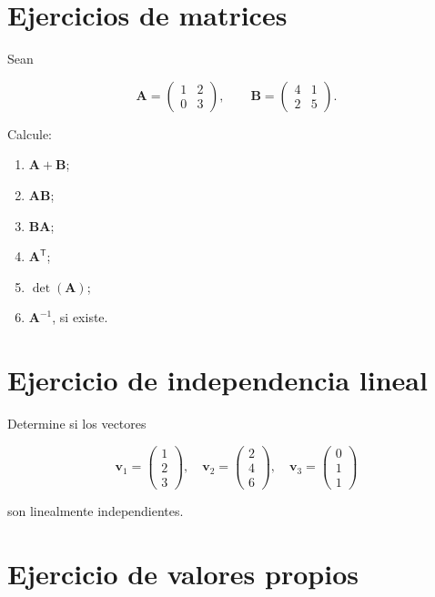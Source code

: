 \documentclass[
  spanish,
  11pt,
  letterpaper,
  DIV=11,
  numbers=noendperiod]{scrreprt}
\providecommand{\tightlist}{%
  \setlength{\itemsep}{0pt}\setlength{\parskip}{0pt}}
\theoremstyle{definition}
\theoremstyle{plain}
\theoremstyle{definition}
\theoremstyle{remark}
\begin{document}
\section{Ejercicios de matrices}\label{ejercicios-de-matrices}

Sean

\[
\mathbf{A}
=
\begin{pmatrix}
1 & 2\\
0 & 3
\end{pmatrix},
\qquad
\mathbf{B}
=
\begin{pmatrix}
4 & 1\\
2 & 5
\end{pmatrix}.
\]

Calcule:

\begin{enumerate}
\def\labelenumi{\arabic{enumi}.}
\tightlist
\item
  \(\mathbf{A}+\mathbf{B}\);
\item
  \(\mathbf{A}\mathbf{B}\);
\item
  \(\mathbf{B}\mathbf{A}\);
\item
  \(\mathbf{A}^{\mathsf T}\);
\item
  \(\det(\mathbf{A})\);
\item
  \(\mathbf{A}^{-1}\), si existe.
\end{enumerate}

\section{Ejercicio de independencia
lineal}\label{ejercicio-de-independencia-lineal}

Determine si los vectores

\[
\mathbf{v}_1=
\begin{pmatrix}
1\\
2\\
3
\end{pmatrix},
\quad
\mathbf{v}_2=
\begin{pmatrix}
2\\
4\\
6
\end{pmatrix},
\quad
\mathbf{v}_3=
\begin{pmatrix}
0\\
1\\
1
\end{pmatrix}
\]

son linealmente independientes.

\section{Ejercicio de valores
propios}\label{ejercicio-de-valores-propios}
\end{document}
